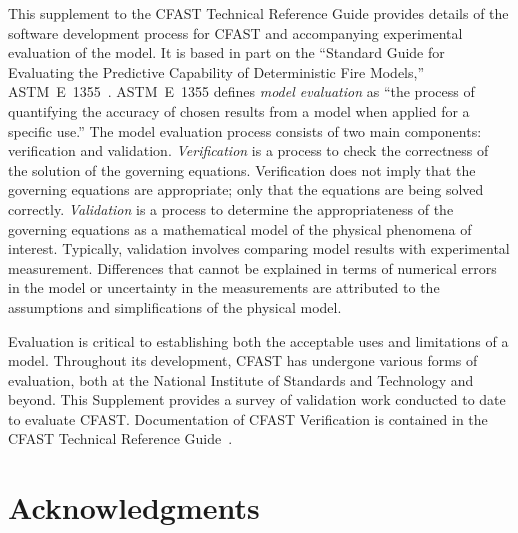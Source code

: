 \documentclass[12pt]{book}
\begin{document}
This supplement to the CFAST Technical Reference Guide provides details of the software development process for CFAST and accompanying experimental evaluation of the model. It is based in part on the ``Standard Guide for Evaluating the Predictive Capability of Deterministic Fire Models,'' ASTM~E~1355~\cite{ASTM:E1355}. ASTM~E~1355 defines {\em model evaluation} as ``the process of quantifying the accuracy of chosen results from a model when applied for a specific use.'' The model evaluation process consists of two main components: verification and validation. {\em Verification} is a process to check the correctness of the solution of the governing equations. Verification does not imply that the governing equations are appropriate; only that the equations are being solved correctly. {\em Validation} is a process to determine the appropriateness of the governing equations as a mathematical model of the physical phenomena of interest. Typically, validation involves comparing model results with experimental measurement. Differences that cannot be explained in terms of numerical errors in the model or uncertainty in the measurements are attributed to the assumptions and simplifications of the physical model.

Evaluation is critical to establishing both the acceptable uses and limitations of a model. Throughout its development, CFAST has undergone various forms of evaluation, both at the National Institute of Standards and Technology and beyond. This Supplement provides a survey of validation work conducted to date to evaluate CFAST. Documentation of CFAST Verification is contained in the CFAST Technical Reference Guide~\cite{CFAST_Tech_Guide_7}.

\chapter{Acknowledgments}

\label{acksection}
\end{document}
